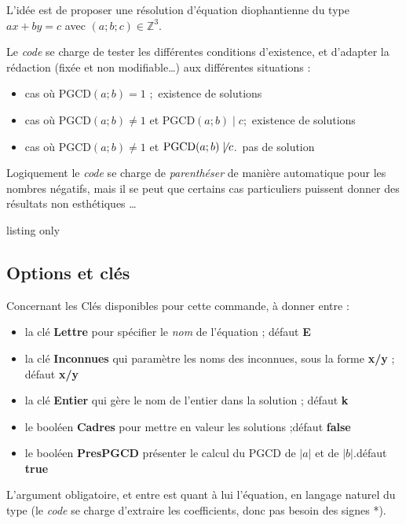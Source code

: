 \documentclass[a4paper,french,11pt]{article}
\newcommand\ctex[1]{\tcbox[vignettelatex]{#1}}
\newcommand\Cle[1]{{\bfseries\sffamily\textlangle \textcolor{orange!75!black}{#1}\textrangle}}
\begin{document}
\begin{tipblock}
L'idée est de proposer une résolution d'équation diophantienne du type $ax+by=c$ avec $(a;b;c) \in \mathbb{Z}^3$.

\smallskip

Le \textit{code} se charge de tester les différentes conditions d'existence, et d'adapter la rédaction (fixée et non modifiable\ldots) aux différentes situations :

\begin{itemize}
	\item cas où $\text{PGCD}(a;b)=1$ ;\hfill~existence de solutions
	\item cas où $\text{PGCD}(a;b) \neq 1$ et $\text{PGCD}(a;b) \mid c$;\hfill~existence de solutions
	\item cas où $\text{PGCD}(a;b) \neq 1$ et $\text{PGCD}(a;b) \not\mid c$.\hfill~pas de solution
\end{itemize}
\vspace*{-\baselineskip}\leavevmode
\end{tipblock}

\begin{warningblock}
Logiquement le \textit{code} se charge de \textit{parenthéser} de manière automatique pour les nombres négatifs, mais il se peut que certains cas particuliers puissent donner des résultats \og non esthétiques \fg{}\ldots
\end{warningblock}

\begin{PresCodeTexPL}{listing only}
\end{PresCodeTexPL}

\subsection{Options et clés}

\begin{cautionblock}
Concernant les Clés disponibles pour cette commande, à donner entre \ctex{[...]} :

\begin{itemize}
	\item la clé \Cle{Lettre} pour spécifier le \textit{nom} de l'équation ; \hfill{}défaut \Cle{E}
	\item la clé \Cle{Inconnues} qui paramètre les noms des inconnues, sous la forme \Cle{x/y} ; \hfill{}défaut \Cle{x/y}
	\item la clé \Cle{Entier} qui gère le nom de l'entier dans la solution ; \hfill{}défaut \Cle{k}
	\item le booléen \Cle{Cadres} pour mettre en valeur les solutions ;\hfill{}défaut \Cle{false}
	\item le booléen \Cle{PresPGCD} présenter le calcul du PGCD de $|a|$ et de $|b|$.\hfill{}défaut \Cle{true}
\end{itemize}

L'argument obligatoire, et entre \ctex{\{...\}} est quant à lui l'équation, en langage \og naturel \fg{} du type \ctex{ax+by=c} (le \textit{code} se charge d'extraire les coefficients, donc pas besoin des signes *).
\end{cautionblock}
\end{document}
